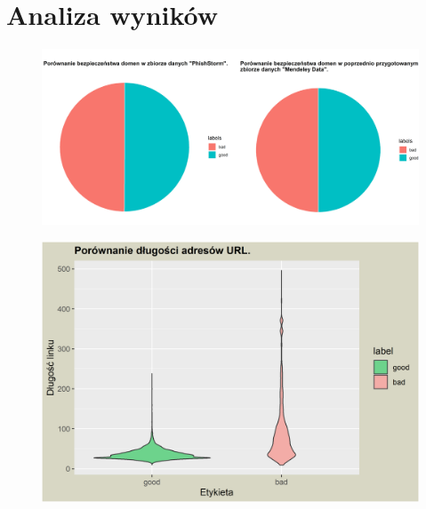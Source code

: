 \documentclass{beamer}
\begin{document}
\section{Analiza wyników}
\begin{frame}
\begin{figure}
	\includegraphics[width=1\linewidth]{../images/rys_5}
\end{figure}
\end{frame}
\begin{frame}
\begin{figure}
	\centering
	\includegraphics[width=1\linewidth]{../images/plot_3}
\end{figure}
\end{frame}
\end{document}
